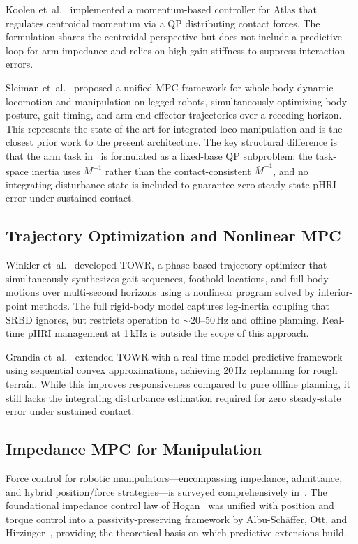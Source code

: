 \documentclass[journal]{IEEEtran}
\newcommand{\Mbar}{\bar{M}^{-1}}
\begin{document}
Koolen et~al.~\cite{koolen2016design} implemented a momentum-based
controller for Atlas that regulates centroidal momentum via a QP
distributing contact forces.
The formulation shares the centroidal perspective but does not include a
predictive loop for arm impedance and relies on high-gain stiffness to
suppress interaction errors.

Sleiman et~al.~\cite{sleiman2021unified} proposed a unified MPC framework
for whole-body dynamic locomotion and manipulation on legged robots,
simultaneously optimizing body posture, gait timing, and arm end-effector
trajectories over a receding horizon.
This represents the state of the art for integrated loco-manipulation and
is the closest prior work to the present architecture.
The key structural difference is that the arm task in~\cite{sleiman2021unified}
is formulated as a fixed-base QP subproblem: the task-space inertia uses
$M^{-1}$ rather than the contact-consistent $\Mbar$, and no integrating
disturbance state is included to guarantee zero steady-state pHRI error
under sustained contact.

\subsection{Trajectory Optimization and Nonlinear MPC}

Winkler et~al.~\cite{winkler2018gait} developed TOWR, a phase-based
trajectory optimizer that simultaneously synthesizes gait sequences,
foothold locations, and full-body motions over multi-second horizons using a
nonlinear program solved by interior-point methods.
The full rigid-body model captures leg-inertia coupling that SRBD ignores,
but restricts operation to ${\sim}20$--50\,Hz and offline planning.
Real-time pHRI management at 1\,kHz is outside the scope of this approach.

Grandia et~al.~\cite{grandia2023perceptive} extended TOWR with a real-time
model-predictive framework using sequential convex approximations, achieving
20\,Hz replanning for rough terrain.
While this improves responsiveness compared to pure offline planning, it
still lacks the integrating disturbance estimation required for zero
steady-state error under sustained contact.

\subsection{Impedance MPC for Manipulation}

Force control for robotic manipulators---encompassing impedance, admittance,
and hybrid position/force strategies---is surveyed comprehensively
in~\cite{villani2016force}.
The foundational impedance control law of Hogan~\cite{hogan1985impedance}
was unified with position and torque control into a passivity-preserving
framework by Albu-Sch\"{a}ffer, Ott, and
Hirzinger~\cite{albu2007unified}, providing the theoretical basis on which
predictive extensions build.
\end{document}
